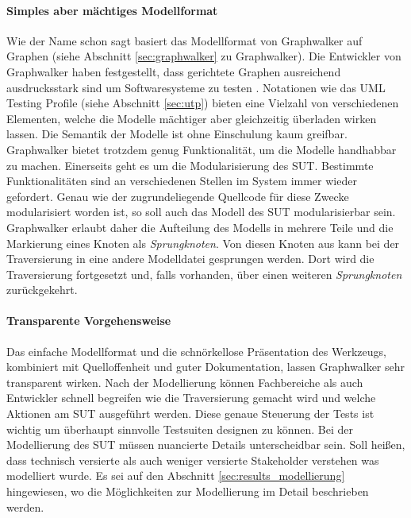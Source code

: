 \paragraph{Simples aber mächtiges Modellformat} Wie der Name schon sagt basiert das Modellformat von Graphwalker auf Graphen (siehe Abschnitt \ref{sec:graphwalker} zu Graphwalker). Die Entwickler von Graphwalker haben festgestellt, dass gerichtete Graphen ausreichend ausdrucksstark sind um Softwaresysteme zu testen \cite{_graphwalker_2015}. Notationen wie das UML Testing Profile (siehe Abschnitt \ref{sec:utp}) bieten eine Vielzahl von verschiedenen Elementen, welche die Modelle mächtiger aber gleichzeitig überladen wirken lassen. Die Semantik der Modelle ist ohne Einschulung kaum greifbar.\\
Graphwalker bietet trotzdem genug Funktionalität, um die Modelle handhabbar zu machen. Einerseits geht es um die Modularisierung des \Gls{SUT}. Bestimmte Funktionalitäten sind an verschiedenen Stellen im System immer wieder gefordert. Genau wie der zugrundeliegende Quellcode für diese Zwecke modularisiert worden ist, so soll auch das Modell des \Gls{SUT} modularisierbar sein. Graphwalker erlaubt daher die Aufteilung des Modells in mehrere Teile und die Markierung eines Knoten als \textit{Sprungknoten}. Von diesen Knoten aus kann bei der Traversierung in eine andere Modelldatei gesprungen werden. Dort wird die Traversierung fortgesetzt und, falls vorhanden, über einen weiteren \textit{Sprungknoten} zurückgekehrt.

\paragraph{Transparente Vorgehensweise} Das einfache Modellformat und die schnörkellose Präsentation des Werkzeugs, kombiniert mit Quelloffenheit und guter Dokumentation, lassen Graphwalker sehr transparent wirken. Nach der Modellierung können Fachbereiche als auch Entwickler schnell begreifen wie die Traversierung gemacht wird und welche Aktionen am \Gls{SUT} ausgeführt werden. Diese genaue Steuerung der Tests ist wichtig um überhaupt sinnvolle Testsuiten designen zu können. Bei der Modellierung des \Gls{SUT} müssen nuancierte Details unterscheidbar sein. Soll heißen, dass technisch versierte als auch weniger versierte Stakeholder verstehen was modelliert wurde. Es sei auf den Abschnitt \ref{sec:results_modellierung} hingewiesen, wo die Möglichkeiten zur Modellierung im Detail beschrieben werden.


